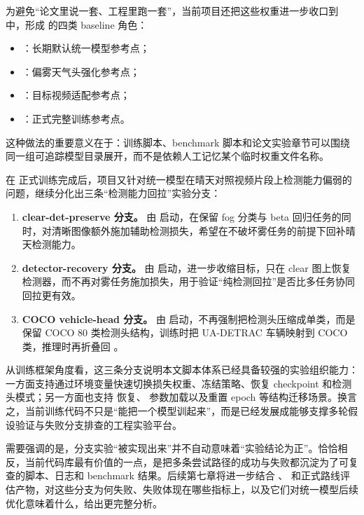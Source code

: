 为避免“论文里说一套、工程里跑一套”，当前项目还把这些权重进一步收口到  中，形成  的四类 baseline 角色：

\begin{itemize}[leftmargin=2em]
\item {}：长期默认统一模型参考点；
\item {}：偏雾天气头强化参考点；
\item {}：目标视频适配参考点；
\item {}：正式完整训练参考点。
\end{itemize}

这种做法的重要意义在于：训练脚本、benchmark 脚本和论文实验章节可以围绕同一组可追踪模型目录展开，而不是依赖人工记忆某个临时权重文件名称。

在  正式训练完成后，项目又针对统一模型在晴天对照视频片段上检测能力偏弱的问题，继续分化出三条“检测能力回拉”实验分支：

\begin{enumerate}[leftmargin=2.5em]
\item \textbf{clear-det-preserve 分支。} 由  启动，在保留 fog 分类与 beta 回归任务的同时，对清晰图像额外施加辅助检测损失，希望在不破坏雾任务的前提下回补晴天检测能力。
\item \textbf{detector-recovery 分支。} 由  启动，进一步收缩目标，只在 clear 图上恢复检测器，而不再对雾任务施加损失，用于验证“纯检测回拉”是否比多任务协同回拉更有效。
\item \textbf{COCO vehicle-head 分支。} 由  启动，不再强制把检测头压缩成单类，而是保留 COCO 80 类检测头结构，训练时把 UA-DETRAC 车辆映射到 COCO  类，推理时再折叠回 。
\end{enumerate}

从训练框架角度看，这三条分支说明本文脚本体系已经具备较强的实验组织能力：一方面支持通过环境变量快速切换损失权重、冻结策略、恢复 checkpoint 和检测头模式；另一方面也支持  恢复、 参数加载以及重置 epoch 等结构迁移场景。换言之，当前训练代码不只是“能把一个模型训起来”，而是已经发展成能够支撑多轮假设验证与失败分支排查的工程实验平台。

需要强调的是，分支实验“被实现出来”并不自动意味着“实验结论为正”。恰恰相反，当前代码库最有价值的一点，是把多条尝试路径的成功与失败都沉淀为了可复查的脚本、日志和 benchmark 结果。后续第七章将进一步结合 、 和正式路线评估产物，对这些分支为何失败、失败体现在哪些指标上，以及它们对统一模型后续优化意味着什么，给出更完整分析。

